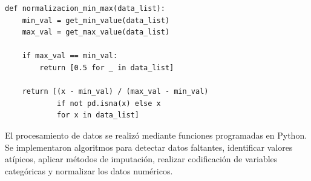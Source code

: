 \documentclass[12pt]{article}
\begin{document}

\begin{lstlisting}[caption=Normalizacion Min-Max, label=lst:minmax]
def normalizacion_min_max(data_list):
    min_val = get_min_value(data_list)
    max_val = get_max_value(data_list)

    if max_val == min_val:
        return [0.5 for _ in data_list]

    return [(x - min_val) / (max_val - min_val) 
            if not pd.isna(x) else x 
            for x in data_list]
\end{lstlisting}

El procesamiento de datos se realizó mediante funciones programadas en Python. Se implementaron algoritmos para detectar datos faltantes, identificar valores atípicos, aplicar métodos de imputación, realizar codificación de variables categóricas y normalizar los datos numéricos.






\end{document}
